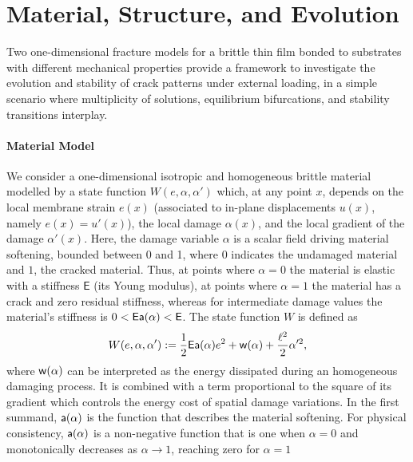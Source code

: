 \section{Material, Structure, and Evolution}
\label{sec:rigid}

Two one-dimensional fracture models for a brittle thin film bonded to substrates with different mechanical properties provide a framework to investigate the evolution and stability of crack patterns under external loading, in a  simple scenario where multiplicity of solutions, equilibrium bifurcations, and stability transitions interplay.


\paragraph{Material Model}
We consider a one-dimensional isotropic and homogeneous brittle material modelled by a state function $W(e, \alpha, \alpha')$ which, at any point $x$,
depends on the local membrane strain $e(x)$ (associated to in-plane displacements $u(x)$, namely $e(x) = u'(x)$), the local damage $\alpha(x)$, and the local gradient of the damage $\alpha'(x)$. 
Here, the damage variable $\alpha$ is a scalar field driving material softening, bounded between 0 and 1, where $0$ indicates the undamaged material and $1$, the cracked material. Thus, at points where $\alpha=0$ the material is elastic with a stiffness $\mathsf{E}$ (its Young modulus), at points where $\alpha=1$ the material has a crack and zero residual stiffness, whereas for intermediate damage values the material's stiffness is $0<\mathsf{E}\mathsf{a}(\alpha)< \mathsf{E}$.  
The state function $W$ is defined as 
\begin{equation}
    \label{def:energy_material}
    W(e, \alpha, \alpha'):= \frac{1}{2} \mathsf{E} \mathsf{a}(\alpha)e^2 +\mathsf{w}(\alpha) + \frac{\ell^2}{2}\alpha'^2,
\end{equation}
where $\mathsf{w}(\alpha)$ can be interpreted as the energy dissipated during an homogeneous damaging process. It is combined with a term proportional to the square of its gradient which controls the energy cost of spatial damage variations. In the first summand, $\mathsf{a}(\alpha)$ is the function that describes the material softening. %
For physical consistency, $\mathsf{a}(\alpha)$ is a non-negative function that is one when $\alpha=0$ and monotonically decreases as $\alpha\to 1$, reaching zero for $\alpha=1$  
